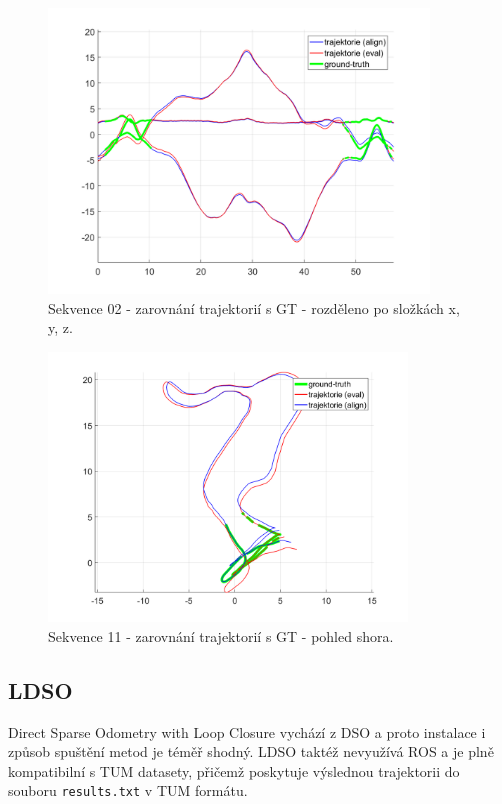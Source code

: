 \documentclass[12pt,a4paper]{report}
\begin{document}
\begin{figure}[H]
\centering
\includegraphics[width=0.9\textwidth]{img/m_dso_11_1.png}
\caption{Sekvence 02 - zarovnání trajektorií s GT - rozděleno po složkách x, y, z.}
\label{24}
\end{figure}

\begin{figure}[H]
\centering
\includegraphics[width=0.85\textwidth]{img/m_dso_11_2.png}
\caption{Sekvence 11 - zarovnání trajektorií s GT - pohled shora.}
\label{25}
\end{figure}


\subsection{LDSO}
Direct Sparse Odometry with Loop Closure vychází z DSO a proto instalace i způsob spuštění metod je téměř shodný. LDSO taktéž nevyužívá ROS a je plně kompatibilní s TUM datasety, přičemž poskytuje výslednou trajektorii do souboru \texttt{results.txt} v TUM formátu.
\end{document}
